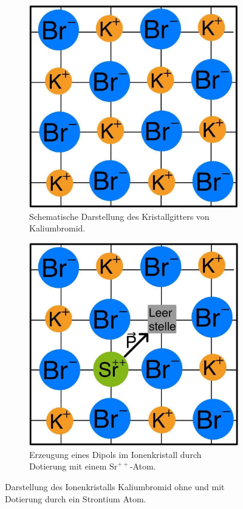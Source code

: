 \begin{figure}[H]
    \begin{subfigure}{0.48\textwidth}
    \centering
    \includegraphics[width=0.85\linewidth]{figs/Kaliumbromid.jpg}
    \caption{Schematische Darstellung des Kristallgitters von Kaliumbromid.}
    \label{fig:tfig1}
    \end{subfigure}
    \begin{subfigure}{0.48\textwidth}
    \centering
    \includegraphics[width=0.85\linewidth]{figs/DipolKBr.jpg}
    \caption{Erzeugung eines Dipols im Ionenkristall durch Dotierung mit einem $\text{Sr}^{++}$-Atom.}
    \label{fig:tfig2}
    \end{subfigure}
    \caption{Darstellung des Ionenkristalls Kaliumbromid ohne und mit Dotierung durch ein Strontium Atom.}
\end{figure}

